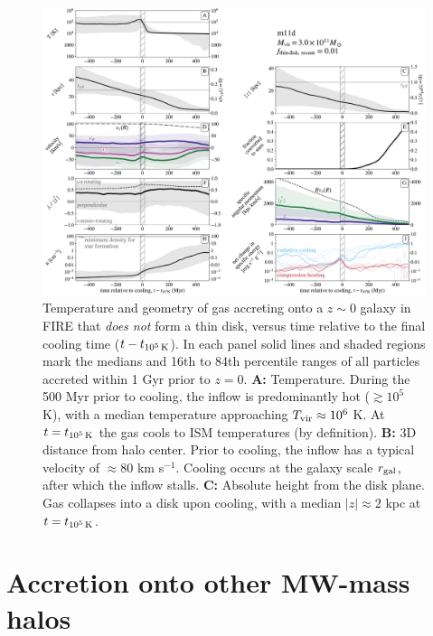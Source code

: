 \documentclass[fleqn,usenatbib]{mnras}
\newcommand{\tcon}{t_{10^5\,{\rm K}}}
\newcommand{\Tvir}{T_{\rm vir}}
\begin{document}
\begin{figure}
\includegraphics[width=\textwidth]{figures/before_and_after/before_and_after_allone_m11d_md.pdf}
\caption{
Temperature and geometry of gas accreting onto a $z\sim0$ galaxy in FIRE that {\em does not} form a thin disk, versus time relative to the final cooling time ($t - \tcon$).
In each panel solid lines and shaded regions mark the medians and 16th to 84th percentile ranges of all particles accreted within 1 Gyr prior to $z=0$.
\textbf{A:}
Temperature. During the 500 Myr prior to cooling, the inflow is predominantly hot ($\gtrsim 10^5$ K), with a median temperature approaching $\Tvir\approx10^6$ K. At $t = \tcon$ the gas cools to ISM temperatures (by definition).
\textbf{B:}
3D distance from halo center. Prior to cooling, the inflow has a typical velocity of $\approx 80$ km s$^{-1}$. Cooling occurs at the galaxy scale $r_{\rm gal}$, after which the inflow stalls.
\textbf{C:}
Absolute height from the disk plane.
Gas collapses into a disk upon cooling, with a median $\vert z \vert \approx 2$ kpc at $t=\tcon$.
}
\label{f: counterexample}
\end{figure}

\section{Accretion onto other MW-mass halos}
\label{s: appendix-other m12s}
\end{document}

